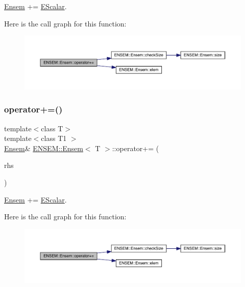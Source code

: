 \mbox{\hyperlink{classENSEM_1_1Ensem}{Ensem}} += \mbox{\hyperlink{classENSEM_1_1EScalar}{E\+Scalar}}. 

Here is the call graph for this function\+:
\nopagebreak
\begin{figure}[H]
\begin{center}
\leavevmode
\includegraphics[width=350pt]{d7/d3e/classENSEM_1_1Ensem_a3b36653814508e90b22543a3f1b465d5_cgraph}
\end{center}
\end{figure}
\mbox{\label{classENSEM_1_1Ensem_a3b36653814508e90b22543a3f1b465d5}} 
\subsubsection{\texorpdfstring{operator+=()}{operator+=()}\hspace{0.1cm}{\footnotesize\ttfamily [2/6]}}
{\footnotesize\ttfamily template$<$class T$>$ \\
template$<$class T1 $>$ \\
\mbox{\hyperlink{classENSEM_1_1Ensem}{Ensem}}\& \mbox{\hyperlink{classENSEM_1_1Ensem}{E\+N\+S\+E\+M\+::\+Ensem}}$<$ T $>$\+::operator+= (\begin{DoxyParamCaption}\item[{const \mbox{\hyperlink{classENSEM_1_1EScalar}{E\+Scalar}}$<$ T1 $>$ \&}]{rhs }\end{DoxyParamCaption})\hspace{0.3cm}{\ttfamily [inline]}}



\mbox{\hyperlink{classENSEM_1_1Ensem}{Ensem}} += \mbox{\hyperlink{classENSEM_1_1EScalar}{E\+Scalar}}. 

Here is the call graph for this function\+:
\nopagebreak
\begin{figure}[H]
\begin{center}
\leavevmode
\includegraphics[width=350pt]{d7/d3e/classENSEM_1_1Ensem_a3b36653814508e90b22543a3f1b465d5_cgraph}
\end{center}
\end{figure}
\mbox{\label{classENSEM_1_1Ensem_a3b36653814508e90b22543a3f1b465d5}} 
